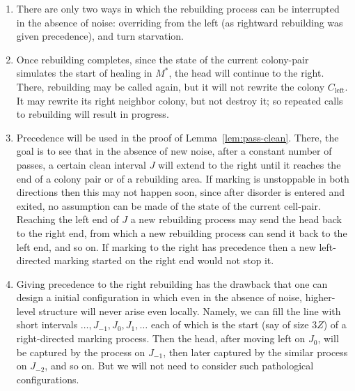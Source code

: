 \documentclass[11pt]{memoir}
\theoremstyle{definition} %
\newcommand{\Z}{Z} %
\newcommand{\Left}{\text{left}}
\begin{document}
\begin{remarks}\label{rem:rebuild-precedence}
  \begin{enumerate}
  \item\label{i:rebuilding-fail}
    There are only two ways in which the rebuilding process can be interrupted in the
    absence of noise: overriding from the left (as rightward rebuilding was given precedence),
    and turn starvation.
  \item
    Once rebuilding completes, since the state of the current colony-pair simulates the start of
    healing in \( M^{*} \), the head will continue to the right.
    There, rebuilding may be called again, but it will not rewrite the colony \( C_{\Left} \).
    It may rewrite its right neighbor colony, but not destroy it; so repeated calls to rebuilding
    will result in progress.
    
  \item Precedence will be used in the proof of Lemma~\ref{lem:pass-clean}.
    There, the goal is to see that in the absence of new noise, after a constant number of passes,
    a certain clean interval \( J \) will extend to the right until it reaches
the end of a colony pair or of a rebuilding area.
If marking is unstoppable in both directions then this may not happen soon, since after disorder
is entered and exited, no assumption can be made of the state of the current cell-pair.
Reaching the left end of  \( J \)
a new rebuilding process may send the head back to the right end, from which a new rebuilding
process can send it back to the left end, and so on.
If marking to the right has precedence then a new left-directed marking started on the right end would not stop it.

\item Giving precedence to the right rebuilding has the drawback that one can design a initial configuration
  in which even in the absence of noise, higher-level structure will never arise even locally.
  Namely, we can fill the line with short intervals \( \dots,J_{-1},J_{0},J_{1},\dots \)
  each of which is the start (say of size \( 3\Z \)) of a
  right-directed marking process.
  Then the head, after moving left on \( J_{0} \), will be captured by the process on \( J_{-1} \), then
  later captured by the similar process on \( J_{-2} \), and so on.
  But we will not need to consider such pathological configurations.

  
  \end{enumerate}
\end{remarks}
\end{document}
